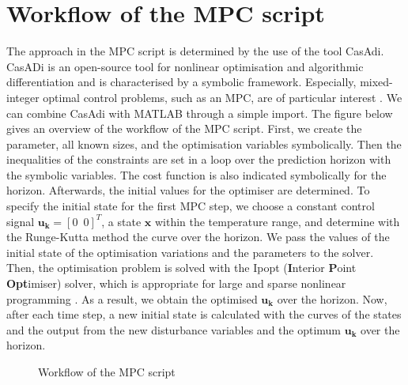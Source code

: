 \section{Workflow of the MPC script}
\label{section:workflowMPC}
The approach in the MPC script is determined by the use of the tool CasAdi. CasADi is an open-source tool for nonlinear optimisation and algorithmic differentiation and is characterised by a symbolic framework. Especially, mixed-integer optimal control problems, such as an MPC, are of particular interest \cite{JoelA.E.Andersson.2018}. We can combine CasAdi with MATLAB through a simple import.\newline
The figure below gives an overview of the workflow of the MPC script. First, we create the parameter, all known sizes, and the optimisation variables symbolically. Then the inequalities of the constraints are set in a loop over the prediction horizon with the symbolic variables. The cost function is also indicated symbolically for the horizon. Afterwards, the initial values for the optimiser are determined. To specify the initial state for the first MPC step, we choose a constant control signal $\mathbf{u_k} = [0\enspace0]^T$, a state $\mathbf{x}$ within the temperature range, and determine with the Runge-Kutta method the curve over the horizon. We pass the values of the initial state of the optimisation variations and the parameters to the solver. Then, the optimisation problem is solved with the Ipopt (\textbf{I}nterior \textbf{P}oint \textbf{Opt}imiser) solver, which is appropriate for large and sparse nonlinear programming \cite{JoelA.E.Andersson.2018}. As a result, we obtain the optimised $\mathbf{u_k}$ over the horizon. Now, after each time step, a new initial state is calculated with the curves of the states and the output from the new disturbance variables and the optimum $\mathbf{u_k}$ over the horizon.
    \begin{figure}[h]
            \centering
            \def\svgwidth{0.75\textwidth}
            
            \caption{Workflow of the MPC script}
            \label{fig:workflowMPC}
    \end{figure}
    
